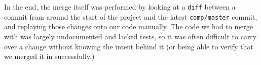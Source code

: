 \documentclass[a4paper,12pt]{article}
\begin{document}
In the end, the merge itself was performed by looking at a \texttt{diff} between a commit from around the start of the project and the latest \texttt{comp/master} commit, and replaying those changes onto our code manually. The code we had to merge with was largely undocumented and lacked tests, so it was often difficult to carry over a change without knowing the intent behind it (or being able to verify that we merged it in successfully.)

\end{document}
